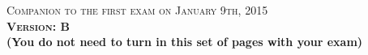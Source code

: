 \documentclass{docist}
\begin{document}
\thispagestyle{empty}

\begin{center}
  {\Large \textsc{Companion to the first exam on January 9th, 2015\\[2ex]
  \textbf{Version: B}\\[2ex]}}
  {\normalsize  \textbf{(You do not need to turn in this set of pages with your exam)}}
\end{center}



\qServiceLayer

\qActiveRecord

\qInstallView

\qThounsandParsecView

\qChecksum

\qAttack

\qSocialCalcTactics

\qThousandParsecTactics

\qGitTactics

\qLayered

\qInterfaceDelegation

\qRepository

\qPeerToPeer

\qArchitectureInfluenceCycle

\qTechoGeeks

\qModuleComponent

\qScenario

\qPipesFilters

\qSocialCalcView

\qGitViews

\qOrderPad

\qEtherCalcAllocation

\qEtherCalcRedundancy

\qEtherCalcSnapshotPerformance

\qEtherCalcModifiabilityTestability

\qFeaturitisOrderPad

\qArchitectureDefinition

\qDesigningArchitecture

\qDecompositionGeneralization

\qUsesStyle
\end{document}

